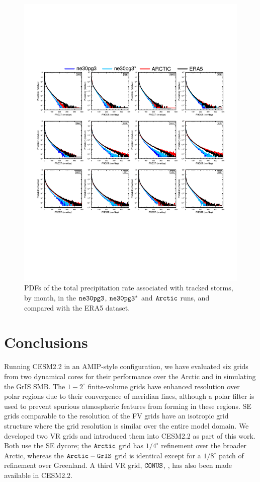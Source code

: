 \documentclass[draft]{agujournal2019}
\begin{document}
\begin{figure}[t]
\begin{center}
         \includegraphics[width=130mm]{temp_composite_ge45N_pdf.pdf}
\end{center}
\caption{PDFs of the total precipitation rate associated with tracked storms, by month, in the $\tt ne30pg3$, $\tt ne30pg3^{*}$ and $\tt Arctic$ runs, and compared with the ERA5 dataset.}
\label{fig:comp-pdf}
\end{figure}

\section{Conclusions}\label{sec:conclusions}

Running CESM2.2 in an AMIP-style configuration, we have evaluated six grids from two dynamical cores for their performance over the Arctic and in simulating the GrIS SMB. The $1-2^{\circ}$ finite-volume grids have enhanced resolution over polar regions due to their convergence of meridian lines, although a polar filter is used to prevent spurious atmospheric features from forming in these regions. SE grids comparable to the resolution of the FV grids have an isotropic grid structure where the grid resolution is similar over the entire model domain. We developed two VR grids and introduced them into CESM2.2 as part of this work. Both use the SE dycore; the $\tt Arctic$ grid has $1/4^{\circ}$ refinement over the broader Arctic, whereas the $\tt Arctic-GrIS$ grid is identical except for a $1/8^{\circ}$ patch of refinement over Greenland. A third VR grid, $\tt CONUS$, {}, has also been made available in CESM2.2.
\end{document}
